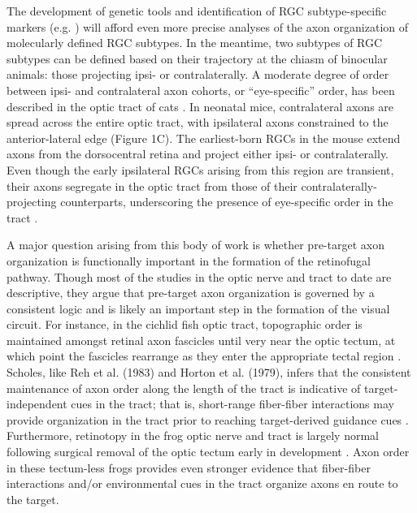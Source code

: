 The development of genetic tools and identification of RGC subtype-specific markers (e.g. \cite{blackshaw2004genomic,dhande2014retinal}) will afford even more precise analyses of the axon organization of molecularly defined RGC subtypes.
In the meantime, two subtypes of RGC subtypes can be defined based on their trajectory at the chiasm of binocular animals: those projecting ipsi- or contralaterally.
A moderate degree of order between ipsi- and contralateral axon cohorts, or “eye-specific” order, has been described in the optic tract of cats \cite{torrealba1982studies}.
In neonatal mice, contralateral axons are spread across the entire optic tract, with ipsilateral axons constrained to the anterior-lateral edge \cite{godement1984prenatal} (Figure 1C). %
The earliest-born RGCs in the mouse extend axons from the dorsocentral retina and project either ipsi- or contralaterally.
Even though the early ipsilateral RGCs arising from this region are transient, their axons segregate in the optic tract from those of their contralaterally-projecting counterparts, underscoring the presence of eye-specific order in the tract \cite{soares2015transient}.

A major question arising from this body of work is whether pre-target axon organization is functionally important in the formation of the retinofugal pathway.
Though most of the studies in the optic nerve and tract to date are descriptive, they argue that pre-target axon organization is governed by a consistent logic and is likely an important step in the formation of the visual circuit.
For instance, in the cichlid fish optic tract, topographic order is maintained amongst retinal axon fascicles until very near the optic tectum, at which point the fascicles rearrange as they enter the appropriate tectal region \cite{scholes1979nerve}.
Scholes, like Reh et al. (1983) and Horton et al. (1979), infers that the consistent maintenance of axon order along the length of the tract is indicative of target-independent cues in the tract; that is, short-range fiber-fiber interactions may provide organization in the tract prior to reaching target-derived guidance cues \cite{scholes1979nerve}.
Furthermore, retinotopy in the frog optic nerve and tract is largely normal following surgical removal of the optic tectum early in development \cite{reh1983organization}.
Axon order in these tectum-less frogs provides even stronger evidence that fiber-fiber interactions and/or environmental cues in the tract organize axons en route to the target.

